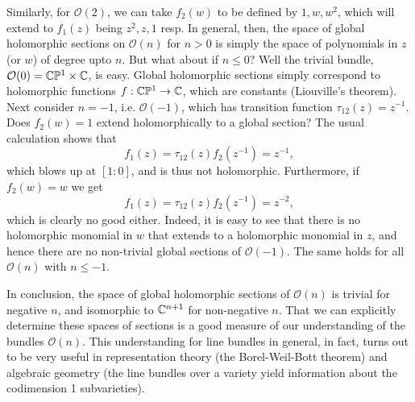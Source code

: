 \documentclass{../../mathnotes}
\begin{document}
Similarly, for $\mathcal{O}(2)$, we can take $f_2(w)$ to be defined by $1,w,w^2$, which will extend to $f_1(z)$ being $z^2,z,1$ resp.
In general, then, the space of global holomorphic sections on $\mathcal{O}(n)$ for $n>0$ is simply the space of polynomials in $z$ (or $w$)
of degree upto $n$.
But what about if $n\leq 0$?  Well the trivial bundle, $\mathcal{O}(0)=\mathbb{C}\mathbb{P}^1\times\mathbb{C}$, is easy. Global holomorphic sections simply correspond to holomorphic
functions $f:\mathbb{C}\mathbb{P}^1\to\mathbb{C}$, which are constants (Liouville's theorem). Next consider $n=-1$, i.e. $\mathcal{O}(-1)$, which has transition function
$\tau_{12}(z)=z^{-1}$. Does $f_2(w)=1$ extend holomorphically to a global section? The usual calculation shows that
\[f_1(z)=\tau_{12}(z)f_2(z^{-1})=z^{-1},\]
which blows up at $[1:0]$, and is thus not holomorphic. Furthermore, if $f_2(w)=w$ we get
\[f_1(z)=\tau_{12}(z)f_2(z^{-1})=z^{-2},\]
which is clearly no good either. Indeed, it is easy to see that there is no holomorphic monomial in $w$ that extends to a holomorphic 
monomial in $z$, and hence there are no non-trivial global sections of $\mathcal{O}(-1)$. The same holds for all $\mathcal{O}(n)$ with
$n\leq -1$.

In conclusion, the space of global holomorphic sections of $\mathcal{O}(n)$ is trivial for negative $n$, and 
isomorphic to $\mathbb{C}^{n+1}$ for non-negative $n$. That we can explicitly determine these spaces of sections is a good measure of our understanding
of the bundles $\mathcal{O}(n)$. This understanding for line bundles in general, in fact, turns out to be very useful in representation theory
(the Borel-Weil-Bott theorem) and algebraic geometry (the line bundles over a variety yield information about the codimension 1 subvarieties).





\newpage



\end{document}
